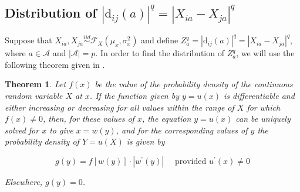 \documentclass[aoas]{imsart}
\newtheorem{theorem}{Theorem}[section]
\begin{document}
\subsection{Distribution of \texorpdfstring{$|\text{d}_{ij}(a)|^q = |X_{ia} - X_{ja}|^q$}{}}

Suppose that $X_{ia}, X_{ja} \overset{iid}{\sim} \mathcal{F}_X(\mu_x,\sigma^2_x)$ and define $Z^q_a = |\text{d}_{ij}(a)|^q = |X_{ia} - X_{ja}|^q$, where $a \in \mathcal{A}$ and $|\mathcal{A}| = p$. In order to find the distribution of $Z^q_a$, we will use the following theorem given in \cite{freund2004}.

\begin{theorem}\label{thm:freund}
	Let $f(x)$ be the value of the probability density of the continuous random variable $X$ at $x$. If the function given by $y = u(x)$ is differentiable and either increasing or decreasing for all values within the range of $X$ for which $f(x) \neq 0$, then, for these values of $x$, the equation $y = u(x)$ can be uniquely solved for $x$ to give $x = w(y)$, and for the corresponding values of $y$ the probability density of $Y = u(X)$ is given by
	
	\[g(y) = f[w(y)] \cdot |w^\prime(y)| \quad \text{ provided } u^\prime(x) \neq 0\]
	
	\noindent Elsewhere, $g(y) = 0$.
\end{theorem}
\end{document}
